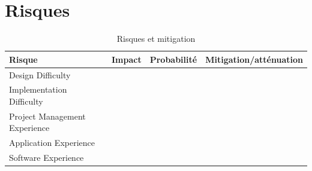 \documentclass[letterpaper
, twoside
, 12pt
,these
,francais
,creativecommons,hyperref
]{thETS}
\begin{document}

\chapter{Risques}




\begin{table}
  \caption{Risques et mitigation}
  \begin{tabular}{|l|l|l|l|}
    \hline
    {\bf Risque} & {\bf Impact} & {\bf Probabilité} & {\bf Mitigation/atténuation} \\
    \hline
    Design Difficulty & & & \\
    \hline
    Implementation Difficulty & & & \\
    \hline
    Project Management Experience & & & \\
    \hline
    Application Experience & & & \\
    \hline
    Software Experience & & & \\
    \hline
  \end{tabular}
\end{table}
\end{document}
